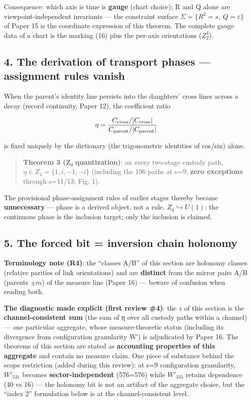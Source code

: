 \documentclass[
]{ltjsarticle}
\begin{document}
Consequence: which axis is time is \textbf{gauge} (chart choice); R and
Q alone are viewpoint-independent invariants --- the constraint surface
\(\Sigma=\{R^2=s,\ Q=\varepsilon\}\) of Paper 15 is the coordinate
expression of this theorem. The complete gauge data of a chart is the
marking (16) plus the per-axis orientations (\(Z_2^{4}\)).

\subsection{4. The derivation of transport phases --- assignment rules
vanish}\label{the-derivation-of-transport-phases-assignment-rules-vanish}

When the parent's identity line persists into the daughters' cross lines
across a decay (record continuity, Paper 12), the coefficient ratio

\[
\eta=\frac{C_{\rm cross}/|C_{\rm cross}|}{C_{\rm parent}/|C_{\rm parent}|}
\]

is fixed uniquely by the dictionary (the trigonometric identities of
cos/sin) alone.

\begin{quote}
\textbf{Theorem 3 (Z₄ quantization)}: on every two-stage custody path,
\(\eta\in Z_4=\{1,i,-1,-i\}\) (including the 196 paths at s=9;
\textbf{zero exceptions} through s=11/13; Fig. 1).
\end{quote}

The provisional phase-assignment rules of earlier stages thereby became
\textbf{unnecessary} --- phase is a derived object, not a rule.
\(Z_4\hookrightarrow U(1)\): the continuous phase is the inclusion
target; only the inclusion is claimed.

\subsection{5. The forced bit = inversion chain
holonomy}\label{the-forced-bit-inversion-chain-holonomy}

\textbf{Terminology note (R4)}: the ``classes A/B'' of this section are
holonomy classes (relative parities of link orientations) and are
\textbf{distinct} from the mirror pairs A/B (parents \(\pm m\)) of the
measure line (Paper 16) --- beware of confusion when reading both.

\textbf{The diagnostic made explicit (first review \#4)}: the \(z\) of
this section is the \textbf{channel-consistent sum} (the sum of η over
all custody paths within a channel) --- one particular aggregate, whose
measure-theoretic status (including its divergence from configuration
granularity W′) is adjudicated by Paper 16. The theorems of this section
are stated as \textbf{accounting properties of this aggregate} and
contain no measure claim. One piece of substance behind the scope
restriction (added during this review): at s=9 configuration
granularity, \(W'_{531}\) becomes \textbf{sector-independent} (576=576)
while \(W'_{333}\) retains dependence (40 vs 16) --- the holonomy bit is
not an artifact of the aggregate choice, but the ``index 2'' formulation
below is at the channel-consistent level.
\end{document}
